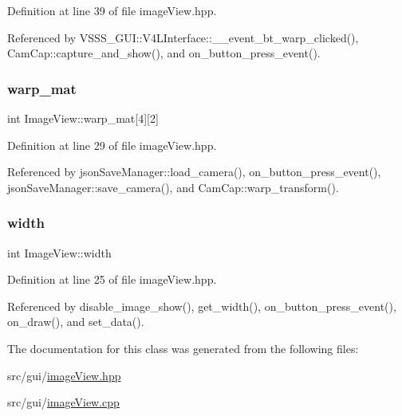 Definition at line 39 of file image\+View.\+hpp.



Referenced by V\+S\+S\+S\+\_\+\+G\+U\+I\+::\+V4\+L\+Interface\+::\+\_\+\+\_\+event\+\_\+bt\+\_\+warp\+\_\+clicked(), Cam\+Cap\+::capture\+\_\+and\+\_\+show(), and on\+\_\+button\+\_\+press\+\_\+event().

\mbox{\label{class_image_view_a483ffadadbb0b3059073c3c6af37bdc7}} 
\subsubsection{\texorpdfstring{warp\+\_\+mat}{warp\_mat}}
{\footnotesize\ttfamily int Image\+View\+::warp\+\_\+mat\mbox{[}4\mbox{]}\mbox{[}2\mbox{]}}



Definition at line 29 of file image\+View.\+hpp.



Referenced by json\+Save\+Manager\+::load\+\_\+camera(), on\+\_\+button\+\_\+press\+\_\+event(), json\+Save\+Manager\+::save\+\_\+camera(), and Cam\+Cap\+::warp\+\_\+transform().

\mbox{\label{class_image_view_a5a491c5256173430d4b16d9abea80727}} 
\subsubsection{\texorpdfstring{width}{width}}
{\footnotesize\ttfamily int Image\+View\+::width}



Definition at line 25 of file image\+View.\+hpp.



Referenced by disable\+\_\+image\+\_\+show(), get\+\_\+width(), on\+\_\+button\+\_\+press\+\_\+event(), on\+\_\+draw(), and set\+\_\+data().



The documentation for this class was generated from the following files\+:\begin{DoxyCompactItemize}
\item 
src/gui/\hyperlink{image_view_8hpp}{image\+View.\+hpp}\item 
src/gui/\hyperlink{image_view_8cpp}{image\+View.\+cpp}\end{DoxyCompactItemize}
